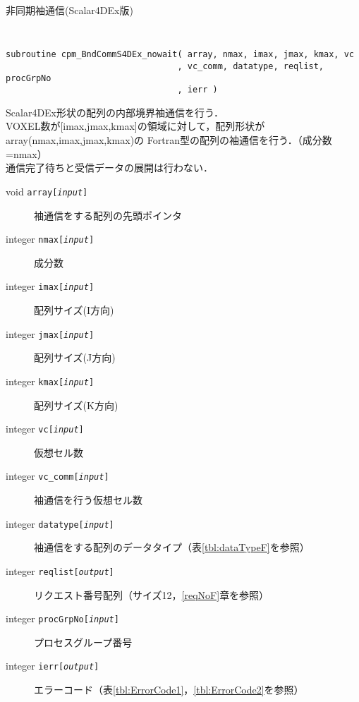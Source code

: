 \begin{spacing}{0.8}
\begin{itembox}[l]{非同期袖通信(Scalar4DEx版)}
{\tt
\begin{verbatim}
subroutine cpm_BndCommS4DEx_nowait( array, nmax, imax, jmax, kmax, vc
                                  , vc_comm, datatype, reqlist, procGrpNo
                                  , ierr )
\end{verbatim}
}
Scalar4DEx形状の配列の内部境界袖通信を行う．\\
VOXEL数が[imax,jmax,kmax]の領域に対して，配列形状がarray(nmax,imax,jmax,kmax)の
Fortran型の配列の袖通信を行う．（成分数=nmax）\\
通信完了待ちと受信データの展開は行わない．
\begin{description}
\item[void    {\tt array[{\it input}]}] 袖通信をする配列の先頭ポインタ
\item[integer {\tt nmax[{\it input}]}] 成分数
\item[integer {\tt imax[{\it input}]}] 配列サイズ(I方向)
\item[integer {\tt jmax[{\it input}]}] 配列サイズ(J方向)
\item[integer {\tt kmax[{\it input}]}] 配列サイズ(K方向)
\item[integer {\tt vc[{\it input}]}] 仮想セル数
\item[integer {\tt vc\_comm[{\it input}]}] 袖通信を行う仮想セル数
\item[integer {\tt datatype[{\it input}]}] 袖通信をする配列のデータタイプ（表\ref{tbl:dataTypeF}を参照）
\item[integer {\tt reqlist[{\it output}]}] リクエスト番号配列（サイズ12，\ref{reqNoF}章を参照）
\item[integer {\tt procGrpNo[{\it input}]}] プロセスグループ番号
\item[integer {\tt ierr[{\it output}]}] エラーコード（表\ref{tbl:ErrorCode1}，\ref{tbl:ErrorCode2}を参照）
\end{description}
\end{itembox}\\
\end{spacing}


